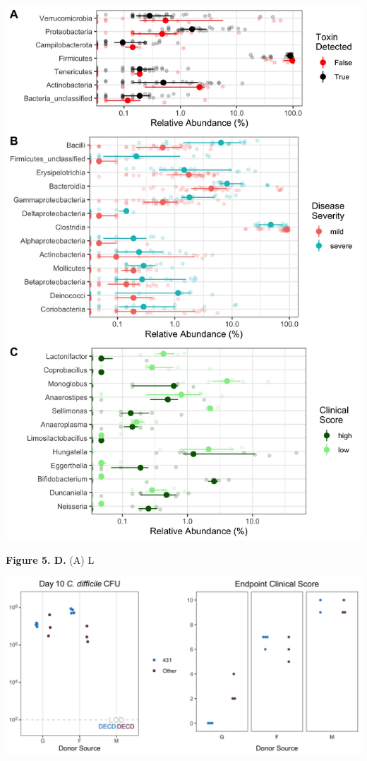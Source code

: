 \documentclass[
  12pt,
]{article}
\begin{document}
\includegraphics{../results/figures/figure_5.jpg}

\textbf{Figure 5. D.} (A) L

\hfill\break

\includegraphics{../results/figures/figure_6.jpg}
\end{document}

